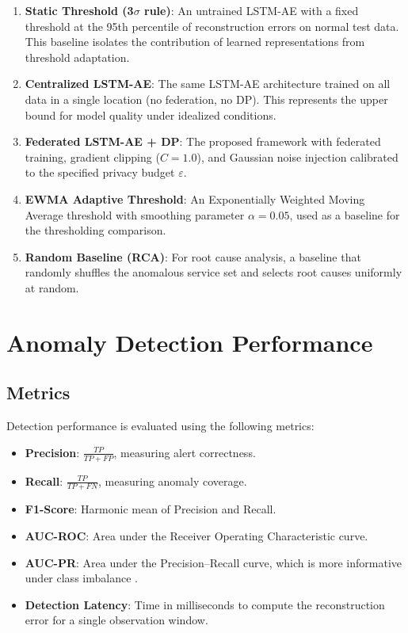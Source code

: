 \begin{enumerate}
    \item \textbf{Static Threshold (3$\sigma$ rule)}: An untrained LSTM-AE
    with a fixed threshold at the 95th percentile of reconstruction errors on
    normal test data. This baseline isolates the contribution of learned
    representations from threshold adaptation.

    \item \textbf{Centralized LSTM-AE}: The same LSTM-AE architecture trained
    on all data in a single location (no federation, no DP). This represents
    the upper bound for model quality under idealized conditions.

    \item \textbf{Federated LSTM-AE + DP}: The proposed framework with
    federated training, gradient clipping ($C=1.0$), and Gaussian noise
    injection calibrated to the specified privacy budget $\varepsilon$.

    \item \textbf{EWMA Adaptive Threshold}: An Exponentially Weighted Moving
    Average threshold with smoothing parameter $\alpha = 0.05$, used as a
    baseline for the thresholding comparison.

    \item \textbf{Random Baseline (RCA)}: For root cause analysis, a baseline
    that randomly shuffles the anomalous service set and selects root causes
    uniformly at random.
\end{enumerate}

\section{Anomaly Detection Performance}
\label{sec:eval_detection}

\subsection{Metrics}
\label{subsec:eval_detection_metrics}

Detection performance is evaluated using the following metrics:

\begin{itemize}
    \item \textbf{Precision}: $\frac{TP}{TP + FP}$, measuring alert
    correctness.
    \item \textbf{Recall}: $\frac{TP}{TP + FN}$, measuring anomaly coverage.
    \item \textbf{F1-Score}: Harmonic mean of Precision and Recall.
    \item \textbf{AUC-ROC}: Area under the Receiver Operating Characteristic
    curve.
    \item \textbf{AUC-PR}: Area under the Precision--Recall curve, which is
    more informative under class imbalance
    \cite{munoz2017impact}.
    \item \textbf{Detection Latency}: Time in milliseconds to compute the
    reconstruction error for a single observation window.
\end{itemize}


